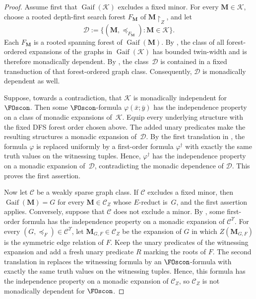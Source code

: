 \documentclass[1p,number,11pt]{elsarticle}
\newcommand{\Gaif}{\operatorname{Gaif}}
\theoremstyle{plain}
\newcommand{\Cc}{\mathscr{C}}
\newcommand{\Dd}{\mathscr{D}}
\newcommand{\MZ}{\mathbf M\!\upharpoonright_Z}
\begin{document}
\begin{proof}
Assume first that $\Gaif(\mathscr K)$ excludes a fixed minor. For every
$\mathbf M\in\mathscr K$, choose a rooted depth-first search forest
$F_{\mathbf M}$ of $\MZ$, and let
\[
   \Dd:=
   \{(\mathbf M,\preceq_{F_{\mathbf M}}):\mathbf M\in\mathscr K\}.
\]
Each $F_{\mathbf M}$ is a rooted spanning forest of
$\Gaif(\mathbf M)$. By , the class of all
forest-ordered expansions of the graphs in $\Gaif(\mathscr K)$ has bounded
twin-width and is therefore monadically dependent. By
, the class~$\Dd$ is contained in
a fixed transduction of that forest-ordered graph class. Consequently,
$\Dd$ is monadically dependent as well.

Suppose, towards a contradiction, that $\mathscr K$ is monadically
independent for~$\FOscon$.  Then some $\FOscon$-formula
$\varphi(\bar x;\bar y)$ has the independence property on a class of monadic
expansions of~$\mathscr K$.  Equip every underlying structure with the fixed
DFS forest order chosen above.  The added unary predicates make the resulting
structures a monadic expansion of~$\Dd$.  By the first translation in
, the formula $\varphi$ is replaced uniformly by a
first-order formula $\varphi^\dagger$ with exactly the same truth values on
the witnessing tuples.  Hence, $\varphi^\dagger$ has the independence property
on a monadic expansion of~$\Dd$, contradicting the monadic dependence of
$\Dd$.  This proves the first assertion.

Now let $\Cc$ be a weakly sparse graph class.
If $\Cc$ excludes a fixed minor, then $\Gaif(\mathbf M)=G$ for every $\mathbf M\in\Cc_Z$ whose $E$-reduct is~$G$, and the first assertion applies.
Conversely, suppose that $\Cc$ does not exclude a minor.
By , some first-order formula has the independence property on a monadic expansion of $\Cc^{\Upsilon}$.
For every $(G,\preceq_F)\in\Cc^{\Upsilon}$, let $\mathbf M_{G,F}\in\Cc_Z$ be the expansion of $G$ in which $Z(\mathbf M_{G,F})$ is the symmetric edge relation of $F$.
Keep the unary predicates of the witnessing expansion and add a fresh unary predicate $R$ marking the roots of $F$.
The second translation in  replaces the witnessing formula by an $\FOscon$-formula with exactly the same truth values on the witnessing tuples.
Hence, this formula has the independence property on a monadic expansion of $\Cc_Z$, so $\Cc_Z$ is not monadically dependent for $\FOscon$.
\end{proof}
\end{document}
